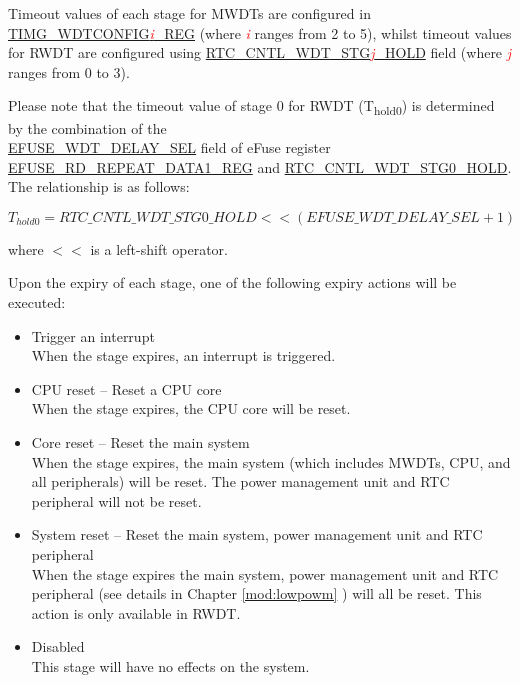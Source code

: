 \documentclass[main\_\_EN.tex]{subfiles}
\begin{document}
Timeout values of each stage for MWDTs are configured in \hyperref[regdesc:TIMGWDTCONFIG2REG]{TIMG\_WDTCONFIG\textcolor{red}{\it{i}}\_REG} (where \textcolor{red}{\it{i}} ranges from 2 to 5), whilst timeout values for RWDT are configured using \hyperref[fielddesc:RTCCNTLWDTSTG3]{RTC\_CNTL\_WDT\_STG\textcolor{red}{\it{j}}\_HOLD} field (where \textcolor{red}{\it{j}} ranges from 0 to 3).

Please note that the timeout value of stage 0 for RWDT (T\textsubscript{hold0}) is determined by the combination of the \\ \hyperref[fielddesc:EFUSEWDTDELAYSEL]{EFUSE\_WDT\_DELAY\_SEL} field of eFuse register \hyperref[regdesc:EFUSERDREPEATDATA1REG]{EFUSE\_RD\_REPEAT\_DATA1\_REG} and \hyperref[fielddesc:RTCCNTLWDTSTG0HOLD]{RTC\_CNTL\_WDT\_STG0\_HOLD}. The relationship is as follows:

\begin{displaymath}
T_{hold0} = \hyperref[fielddesc:RTCCNTLWDTSTG0HOLD]{RTC\_CNTL\_WDT\_STG0\_HOLD}   << (\hyperref[fielddesc:EFUSEWDTDELAYSEL]{EFUSE\_WDT\_DELAY\_SEL} + 1)
\end{displaymath}

where $<<$ is a left-shift operator.

Upon the expiry of each stage, one of the following expiry actions will be executed:
\begin{itemize}
    \item Trigger an interrupt\\
    When the stage expires, an interrupt is triggered.
    \item CPU reset -- Reset a CPU core\\
    When the stage expires, the CPU core will be reset.
    \item Core reset -- Reset the main system\\
    When the stage expires, the main system (which includes MWDTs, CPU, and all peripherals) will be reset. The power management unit and RTC peripheral will not be reset.
    \item System reset -- Reset the main system, power management unit and RTC peripheral\\
    When the stage expires the main system, power management unit and RTC peripheral (see details in Chapter \ref{mod:lowpowm} \textit{}) will all be reset. This action is only available in RWDT.
    \item Disabled\\
    This stage will have no effects on the system.
\end{itemize}
\end{document}

